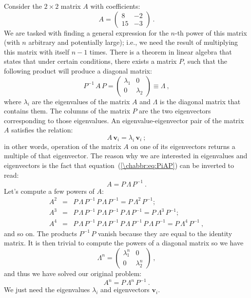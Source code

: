 Consider the $2\times 2$ matrix $A$ with coefficients:
\[
	A = \begin{pmatrix}8&-2\\ 15&-3\end{pmatrix}\ .
\]
We are tasked with finding a general expression for the $n$-th power of this matrix (with $n$ arbitrary and potentially large); i.e., we need the result of multiplying this matrix with itself $n-1$ times. There is a theorem in linear algebra that states that under certain conditions, there exists a matrix $P$, such that the following product will produce a diagonal matrix:
\begin{equation}
	P^{-1}\,A\,P = \begin{pmatrix}\lambda_1&0\\ 0&\lambda_2\end{pmatrix} \equiv \Lambda\ ,\label{\chabbr:eq:PiAP}
\end{equation}
where $\lambda_i$ are the eigenvalues of the matrix $A$ and $\Lambda$ is the diagonal matrix that contains them.  The columns of the matrix $P$ are the two eigenvectors corresponding to those eigenvalues.  An eigenvalue-eigenvector pair of the matrix $A$ satisfies the relation:
\begin{equation}
	A\,\mathbf{v}_i = \lambda_i\, \mathbf{v}_i\ ;\label{\chabbr:eq:eigenequation}
\end{equation}
in other words, operation of the matrix $A$ on one of its eigenvectors returns a multiple of that eigenvector.  The reason why we are interested in eigenvalues and eigenvectors is the fact that equation~(\ref{\chabbr:eq:PiAP}) can be inverted to read:
\[
	A = P\, \Lambda\, P^{-1}\ .
\]
Let's compute a few powers of $A$:
\begin{eqnarray*}
	A^2 &=& P\, \Lambda\, P^{-1}\,P\, \Lambda\, P^{-1} = P\, \Lambda^2\, P^{-1};\\
	A^3 &=& P\, \Lambda\, P^{-1}\,P\, \Lambda\, P^{-1}\,P\, \Lambda\, P^{-1} = P\, \Lambda^3\, P^{-1};\\
	A^4 &=& P\, \Lambda\, P^{-1}\,P\, \Lambda\,  P^{-1}\,P\, \Lambda\, P^{-1}\,P\, \Lambda\,P^{-1} = P\, \Lambda^4\, P^{-1}\ ,
\end{eqnarray*}
and so on.  The products $P^{-1}\,P$ vanish because they are equal to the identity matrix.  It is then trivial to compute the powers of a diagonal matrix so we have
\[
	\Lambda^n =  \begin{pmatrix}\lambda^n_1&0\\ 0&\lambda^n_2\end{pmatrix}\ , 
\]
and thus we have solved our original problem:
\[
	A^n = P\, \Lambda^n\,P^{-1}\ .
\]
We just need the eigenvalues $\lambda_i$ and eigenvectors $\mathbf{v}_i$.

